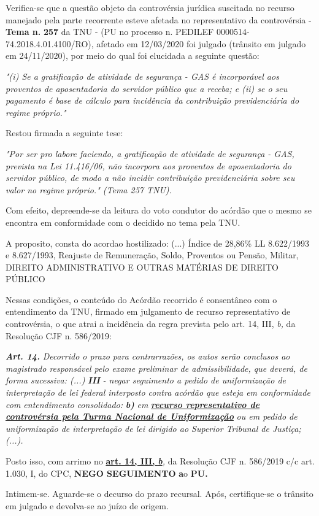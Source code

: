 \documentclass[12pt]{article}
\begin{document}
\justifying
\noindent Verifica-se que a questão objeto da controvérsia jurídica suscitada no recurso manejado pela parte recorrente esteve afetada no representativo da controvérsia - \textbf{Tema n. }\textbf{257} da TNU - (PU no processo n. PEDILEF 0000514-74.2018.4.01.4100/RO),  afetado em 12/03/2020 foi julgado (trânsito em julgado em 24/11/2020), por meio do qual foi elucidada a seguinte questão:

\noindent \textit{"(i) Se a gratificação de atividade de segurança - GAS é incorporável aos proventos de aposentadoria do servidor público que a receba;  e (ii) se o seu pagamento é base de cálculo para incidência da contribuição previdenciária do regime próprio."}

\noindent Restou firmada a seguinte tese:

\noindent \textit{"Por ser pro labore faciendo, a gratificação de atividade de segurança - GAS, prevista na Lei 11.416/06, não incorpora aos proventos de aposentadoria do servidor público, de modo a não incidir contribuição previdenciária sobre seu valor no regime próprio." (Tema 257 TNU).}

\noindent Com efeito, depreende-se da leitura do voto condutor do acórdão que o mesmo se encontra em conformidade com o decidido no  tema pela TNU.

\noindent A proposito, consta do acordao hostilizado: (...) Índice de 28,86\% LL 8.622/1993 e 8.627/1993, Reajuste de Remuneração, Soldo, Proventos ou Pensão, Militar, DIREITO ADMINISTRATIVO E OUTRAS MATÉRIAS DE DIREITO PÚBLICO

\noindent Nessas condições, o conteúdo do Acórdão recorrido é consentâneo com o entendimento da TNU, firmado em julgamento de recurso representativo de controvérsia, o que atrai a incidência da regra prevista pelo art. 14, III, \textit{b,} da Resolução CJF n. 586/2019:

\noindent \textit{\textbf{Art. 14.}}\textit{ Decorrido o prazo para contrarrazões, os autos serão conclusos ao magistrado responsável pelo exame preliminar de admissibilidade, que deverá, de forma sucessiva: (...) }\textit{\textbf{III }}\textit{- negar seguimento a pedido de uniformização de interpretação de lei federal interposto contra acórdão que esteja em conformidade com entendimento consolidado: }\textit{\textbf{b)}}\textit{ em }\uline{\textit{\textbf{recurso representativo de controvérsia pela Turma Nacional de Uniformização}}}\textit{ ou em pedido de uniformização de interpretação de lei dirigido ao Superior Tribunal de Justiça;(...).}

\noindent Posto isso, com arrimo no \uline{\textbf{art. 14, III, }}\uline{\textit{\textbf{b}}}\textit{,} da Resolução CJF n. 586/2019 c/c art. 1.030, I, do CPC, \textbf{NEGO SEGUIMENTO }\textbf{a}o\textbf{ PU}\textbf{.}

\noindent Intimem-se. Aguarde-se o decurso do prazo recursal. Após, certifique-se o trânsito em julgado e devolva-se ao juízo de origem.
\end{document}
